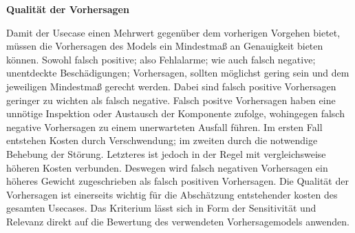 \textbf{Qualität der Vorhersagen}

Damit der Usecase einen Mehrwert gegenüber dem vorherigen Vorgehen bietet, müssen die Vorhersagen des Models ein Mindestmaß an Genauigkeit bieten können. Sowohl falsch positive; also Fehlalarme; wie auch falsch negative; unentdeckte Beschädigungen; Vorhersagen, sollten möglichst gering sein und dem jeweiligen Mindestmaß gerecht werden.
Dabei sind falsch positive Vorhersagen geringer zu wichten als falsch negative. Falsch positve Vorhersagen haben eine unnötige Inspektion oder Austausch der Komponente zufolge, wohingegen falsch negative Vorhersagen zu einem unerwarteten Ausfall führen. Im ersten Fall entstehen Kosten durch Verschwendung; im zweiten durch die notwendige Behebung der Störung. Letzteres ist jedoch in der Regel mit vergleichsweise höheren Kosten verbunden. Deswegen wird falsch negativen Vorhersagen ein höheres Gewicht zugeschrieben als falsch positiven Vorhersagen. 
Die Qualität der Vorhersagen ist einerseits wichtig für die Abschätzung entstehender kosten des gesamten Usecases. Das Kriterium lässt sich in Form der Sensitivität und Relevanz direkt auf die Bewertung des verwendeten Vorhersagemodels anwenden.

